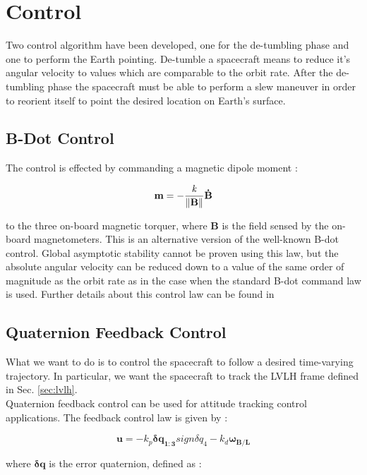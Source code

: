 \documentclass[11pt,a4paper]{report}
\begin{document}
\chapter{Control} 
\label{chap:control}
Two control algorithm have been developed, one for the de-tumbling phase and one to perform the Earth pointing.
De-tumble a spacecraft means to reduce it's angular velocity to values which are comparable to the orbit rate.
After the de-tumbling phase the spacecraft must be able to perform a slew maneuver in order to reorient itself to point the desired location on Earth's surface.

\section{B-Dot Control}
The control is effected by commanding a magnetic dipole moment : 

\begin{equation}
 \mathbf{m} = - \frac{\mathit{k}}{\left\lVert\mathbf{B}\right\rVert}\mathbf{\dot{B}}
\end{equation}

to the three on-board magnetic torquer, where $\mathbf{B}$ is the field sensed by the on-board magnetometers. This is an alternative version of the well-known B-dot control. Global asymptotic stability cannot be proven using this law, but the absolute angular velocity can be reduced down to a value of the same order of magnitude as the orbit rate as in the case when the standard B-dot command law is used. 
Further details about this control law can be found in \cite{Ref:Articles:Lovera}

\section{Quaternion Feedback Control}
What we want to do is to control the spacecraft to follow a desired time-varying trajectory. In particular, we want the spacecraft to track the LVLH frame defined in Sec. \ref{sec:lvlh}.\\
Quaternion feedback control can be used for attitude tracking control applications.
The feedback control law is given by :

\begin{equation}
\label{eq:idealcontrol}
 \mathbf{u} = -\mathit{k_p}\mathbf{\delta q_{1:3}}sign\mathit{\delta q_{4}} - \mathit{k_d}\mathbf{\omega_{B/L}}
\end{equation}

where $\mathbf{\delta q}$ is the error quaternion, defined as :
\end{document}
